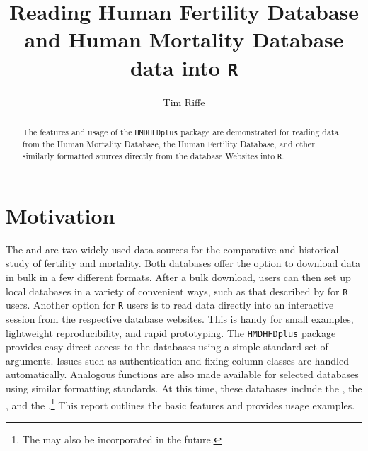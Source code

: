 \documentclass{article}
\begin{document}
\title{Reading Human Fertility Database and Human Mortality Database data into \texttt{R}}
\author{Tim Riffe}
\maketitle
\begin{abstract}
The features and usage of the \texttt{HMDHFDplus} package are demonstrated for
reading data from the Human Mortality Database, the Human Fertility Database,
and other similarly formatted sources directly from the database Websites into
\texttt{R}.
\end{abstract}

\section{Motivation}
The \citet{HFD} and \citet{HMD} are two widely used data sources
for the comparative and historical study of fertility and mortality. Both
databases offer the option to download data in bulk in a few different formats. After a bulk
download, users can then set up local databases in a variety of
convenient ways, such as that described by \citet{minton2015} for \texttt{R}
\citep{Rcitation} users. Another option for \texttt{R} users is to read data
directly into an interactive session from the respective database websites. This
is handy for small examples, lightweight reproducibility, and rapid
prototyping.
The \texttt{HMDHFDplus} package provides easy direct access to the databases using a simple standard set of arguments. Issues such as authentication and fixing column classes are handled
automatically. Analogous functions are also made
available for selected databases using similar formatting standards. At this
time, these databases include the \citet{JMD}, the \citet{CHMD}, and the
\citet{HFC}.\footnote{The \citet{HLD} may also be
incorporated in the future.} This report outlines the basic features and provides usage
examples.
\end{document}
